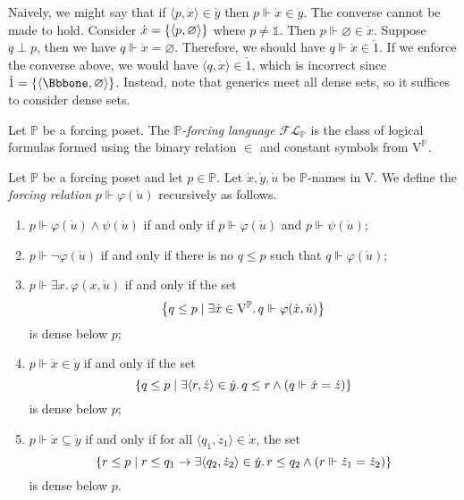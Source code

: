 Naively, we might say that if \( \langle p, \dot x \rangle \in \dot y \) then \( p \Vdash \dot x \in \dot y \).
The converse cannot be made to hold.
Consider \( \dot x = \qty{\langle p, \varnothing \rangle} \) where \( p \neq \Bbbone \).
Then \( p \Vdash \varnothing \in \dot x \).
Suppose \( q \perp p \), then we have \( q \Vdash \dot x = \varnothing \).
Therefore, we should have \( q \Vdash \dot x \in \check 1 \).
If we enforce the converse above, we would have \( \langle q, \dot x \rangle \in \check 1 \), which is incorrect since \( \check 1 = \qty{\langle \Bbbone, \varnothing \rangle} \).
Instead, note that generics meet all dense sets, so it suffices to consider dense sets.
\begin{definition}
    Let \( \mathbb P \) be a forcing poset.
    The \emph{\( \mathbb P \)-forcing language} \( \mathcal{FL}_{\mathbb P} \) is the class of logical formulas formed using the binary relation \( \in \) and constant symbols from \( \mathrm{V}^{\mathbb P} \).
\end{definition}
\begin{definition}
    Let \( \mathbb P \) be a forcing poset and let \( p \in \mathbb P \).
    Let \( \dot x, \dot y, \dot u \) be \( \mathbb P \)-names in \( \mathrm{V} \).
    We define the \emph{forcing relation} \( p \Vdash \varphi(\dot u) \) recursively as follows.
    \begin{enumerate}
        \item \( p \Vdash \varphi(\dot u) \wedge \psi(\dot u) \) if and only if \( p \Vdash \varphi(\dot u) \) and \( p \Vdash \psi(\dot u) \);
        \item \( p \Vdash \neg\varphi(\dot u) \) if and only if there is no \( q \leq p \) such that \( q \Vdash \varphi(\dot u) \);
        \item \( p \Vdash \exists x.\, \varphi(x, \dot u) \) if and only if the set
        \[ \qty{q \leq p \mid \exists \dot x \in \mathrm{V}^{\mathbb P}.\, q \Vdash \varphi(\dot x, \dot u)} \]
        is dense below \( p \);
        \item \( p \Vdash \dot x \in \dot y \) if and only if the set
        \[ \qty{q \leq p \mid \exists \langle r, \dot z \rangle \in \dot y.\, q \leq r \wedge (q \Vdash \dot x = \dot z)} \]
        is dense below \( p \);
        \item \( p \Vdash \dot x \subseteq \dot y \) if and only if for all \( \langle q_1, \dot z_1 \rangle \in \dot x \), the set
        \[ \qty{r \leq p \mid r \leq q_1 \to \exists \langle q_2, \dot z_2 \rangle \in \dot y.\, r \leq q_2 \wedge (r \Vdash \dot z_1 = \dot z_2)} \]
        is dense below \( p \).
    \end{enumerate}
\end{definition}
